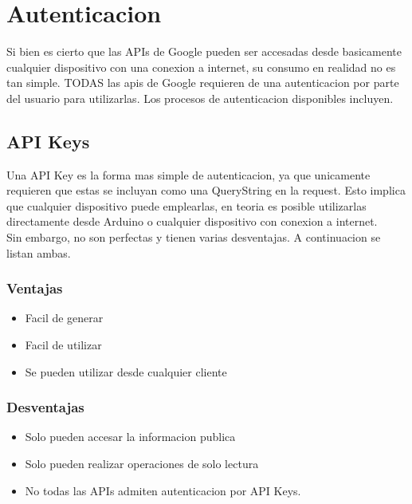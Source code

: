 \documentclass[titlepage]{article} %
\begin{document}
\section{Autenticacion}
Si bien es cierto que las APIs de Google pueden ser accesadas desde 
basicamente cualquier dispositivo con una conexion a internet, su consumo en realidad no es tan simple. 
TODAS las apis de Google requieren de una autenticacion por 
parte del usuario para utilizarlas.
Los procesos de autenticacion disponibles incluyen.
\subsection{API Keys}
Una API Key es la forma mas simple de autenticacion, ya que 
unicamente requieren que estas se incluyan como una QueryString 
en la request. Esto implica que cualquier dispositivo puede emplearlas, 
en teoria es posible utilizarlas directamente desde Arduino o cualquier dispositivo con conexion a internet.\\
Sin embargo, no son perfectas y tienen varias desventajas.
A continuacion se listan ambas.
\subsubsection{Ventajas}
\begin{itemize}
  \item Facil de generar
  \item Facil de utilizar
  \item Se pueden utilizar desde cualquier cliente
\end{itemize}
\subsubsection{Desventajas}
\begin{itemize}
  \item Solo pueden accesar la informacion publica
  \item Solo pueden realizar operaciones de solo lectura
  \item No todas las APIs admiten autenticacion por API Keys.
\end{itemize}
\end{document}
